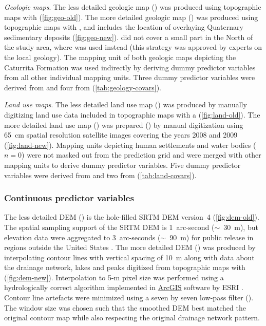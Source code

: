 \noindent\textit{Geologic maps}. The less detailed geologic map (\geoOld) was produced using topographic maps 
with  \cite{GasparettoEtAl1988} (\autoref{fig:geo-old}). The more detailed geologic map (\geoNew) 
was produced using topographic maps with , and includes the location of overlaying Quaternary 
sedimentary deposits \cite{MacielFilho1990} (\autoref{fig:geo-new}). \geoNew{} did not cover a small part in 
the North of the study area, where \geoOld{} was used instead (this strategy was approved by experts on the 
local geology). The mapping unit of both geologic maps depicting the Caturrita Formation was used indirectly 
by deriving dummy predictor variables from all other individual mapping units. Three dummy predictor variables 
were derived from \geoOld{} and four from \geoNew{} (\autoref{tab:geology-covars}).

\noindent\textit{Land use maps}. The less detailed land use map (\landOld) was produced by manually digitizing 
land use data included in topographic maps with a  \cite{DSG1980, DSG1992, DSG1992a} 
(\autoref{fig:land-old}). The more detailed land use map (\landNew) was prepared () by manual 
digitization using 65~cm spatial resolution satellite images covering the years 2008 and 2009 
\cite{SamuelRosaEtAl2011a} (\autoref{fig:land-new}). Mapping units depicting human settlements and water bodies 
($n=0$) were not masked out from the prediction grid and were merged with other mapping units to derive dummy 
predictor variables. Five dummy predictor variables were derived from \landNew{} and two from \landOld{} 
(\autoref{tab:land-covars}).

\subsubsection*{Continuous predictor variables}
\label{subsubsec:continuous-covars}

The less detailed DEM (\demOld) is the hole-filled SRTM DEM version~4 \cite{JarvisEtAl2008} 
(\autoref{fig:dem-old}). The spatial sampling support of the SRTM DEM is 1~arc-second ($\sim$~30~m), but 
elevation data were aggregated to 3~arc-seconds ($\sim$~90~m) for public release in regions outside the United 
States \cite{ReuterEtAl2007}. The more detailed DEM (\demNew) was produced by interpolating contour lines with 
vertical spacing of 10~m along with data about the drainage network, lakes and peaks digitized from topographic 
maps with  (\autoref{fig:dem-new}). Interpolation to 5-m pixel size was performed using a 
hydrologically correct algorithm implemented in 
\href{http://resources.arcgis.com/en/help/main/10.1/index.html#/How_Topo_to_Raster_works/009z0000007m000000/}{ 
ArcGIS\textregistered{}} software by ESRI \cite{Hutchinson1989}. Contour line artefacts were minimized using a 
seven by seven low-pass filter (). The window size was chosen such that the smoothed DEM 
best matched the original contour map while also respecting the original drainage network pattern.


